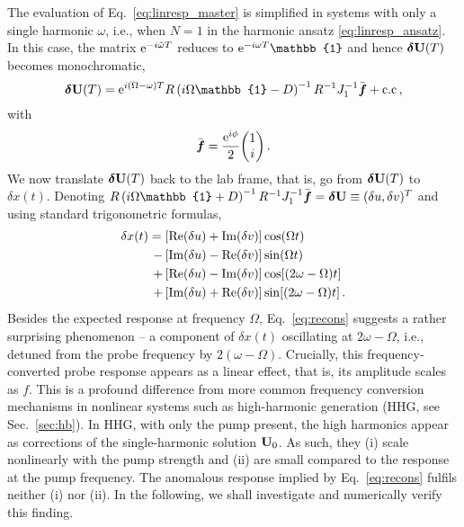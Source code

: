 The evaluation of Eq.~\eqref{eq:linresp_master} is simplified in systems with only a single harmonic $\omega$, i.e., when $N = 1$ in the harmonic ansatz \eqref{eq:linresp_ansatz}. In this case, the matrix ${\rm e}^{-i\tilde{\omega} T}$ reduces to $ \e^{-i \omega T} \mathbb{1}$ and hence $\boldsymbol{\delta} \vb{U}(T)$ becomes monochromatic,
\begin{equation} \label{eq:linresp1_master}
\bdel{U}(T) =  \e^{i (\Omega - \omega)T} R \left( i \Omega \mathbb{1} - D \right)^{-1} R^{-1} J_1^{-1} \bbar{f} + \text{c.c} \,,
\end{equation}
with 
\begin{equation}
\bbar{f} = \frac{\e^{i \phi}}{2} \mqty(1 \\ i)\,.
\end{equation}
We now translate $\boldsymbol{\delta} \vb{U}(T)$ back to the lab frame, that is, go from $\boldsymbol{\delta} \vb{U}(T)$ to $\delta x(t)$. Denoting $R \left( i \Omega \mathbb{1} + D \right)^{-1} R^{-1} J_1^{-1}  \bbar{f} = \bdel{U} \equiv (\delta u, \delta v)^T$ and using standard trigonometric formulas,
\begin{equation} \label{eq:recons}
\begin{split}
\delta x(t) = \left[\text{Re} (\delta u) + \text{Im} (\delta v) \right] &\cos(\Omega t) \\
 - \left[\text{Im} (\delta u) - \text{Re} (\delta v) \right] &\sin(\Omega t)  \\
+ \left[\text{Re} (\delta u) - \text{Im} (\delta v) \right] &\cos[(2\omega - \Omega)t] \\
+ \left[\text{Im} (\delta u) + \text{Re} (\delta v) \right] &\sin[(2\omega - \Omega)t]\,.
\end{split}
\end{equation}
Besides the expected response at frequency $\Omega$, Eq.~\eqref{eq:recons} suggests a rather surprising phenomenon -- a component of $\delta x(t)$ oscillating at $2\omega - \Omega$, i.e., detuned from the probe frequency by $2(\omega-\Omega)$. Crucially, this frequency-converted probe response appears as a linear effect, that is, its amplitude scales as $f$. This is a profound difference from more common frequency conversion mechanisms in nonlinear systems such as high-harmonic generation (HHG, see Sec.~\ref{sec:hb}). In HHG, with only the pump present, the high harmonics appear as corrections of the single-harmonic solution $\vb{U}_0$. As such, they (i) scale nonlinearly with the pump strength and (ii) are small compared to the response at the pump frequency. The anomalous response implied by Eq.~\eqref{eq:recons} fulfils neither (i) nor (ii). In the following, we shall investigate and numerically verify this finding.  


